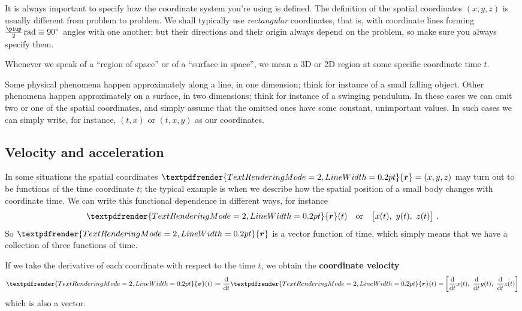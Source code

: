 \documentclass[a4paper,12pt,%
onecolumn,oneside,%
british%
]{memoir}
\renewcommand*{\bm}[1]{\textpdfrender{TextRenderingMode=2,LineWidth=0.2pt}{\boldsymbol{#1}}}
\newcommand*{\pu}{\piup}%
\newcommand*{\di}{\mathrm{d}}%
\newcommand*{\defd}{\coloneqq}
\renewcommand*{\|}[1][]{\nonscript\:#1\vert\nonscript\:\mathopen{}}
\newcommand*{\yr}{\bm{r}}
\newcommand*{\yv}{\bm{v}}
\begin{document}
It is always important to specify how the coordinate system you're using is defined.
The definition of the spatial coordinates $(x,y,z)$ is usually different from problem to problem. We shall typically use \emph{rectangular} coordinates, that is, with coordinate lines forming $\frac{\pu}{2}\,\unit{rad} \equiv \ang{90}$ angles with one another; but their directions and their origin always depend on the problem, so make sure you always specify them.

Whenever we speak of a \enquote{region of space} or of a \enquote{surface in space}, we mean a 3D or 2D region at some specific coordinate time $t$.

\medskip

Some physical phenomena happen approximately along a line, in one dimension; think for instance of a small falling object. Other phenomena happen approximately on a surface, in two dimensions; think for instance of a swinging pendulum. In these cases we can omit two or one of the spatial coordinates, and simply assume that the omitted ones have some constant, unimportant values. In such cases we can simply write, for instance, $(t,x)$ or $(t,x,y)$ as our coordinates.




\subsection{Velocity and acceleration}
\label{sec:velocity}

In some situations the spatial coordinates $\yr=(x,y,z)$ may turn out to be functions of the time coordinate $t$; the typical example is when we describe how the spatial position of a small body changes with coordinate time. We can write this functional dependence in different ways, for instance
\begin{equation*}
  \yr(t)\quad\text{or}\quad
  \bigl[x(t),\ y(t),\ z(t)\bigr] \ .
\end{equation*}
So $\yr$ is a vector function of time, which simply means that we have a collection of three functions of time.

If we take the derivative of each coordinate with respect to the time $t$, we obtain the \textbf{coordinate velocity}
\begin{equation*}
  \yv(t) \defd \frac{\di}{\di t}\yr(t) = \biggl[\frac{\di}{\di t} x(t),\ \frac{\di}{\di t} y(t),\ \frac{\di}{\di t} z(t)\biggr]
\end{equation*}
which is also a vector.
\end{document}
